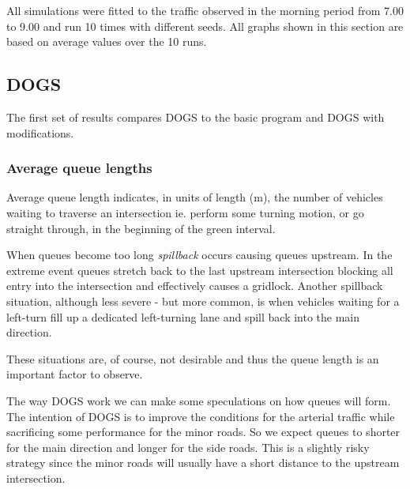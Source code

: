 All simulations were fitted to the traffic observed in the morning period from 7.00 to 9.00 and run 10 times with different seeds. All graphs shown in this section are based on average values over the 10 runs.

\subsection{DOGS}
The first set of results compares DOGS to the basic program and DOGS with modifications.

\subsubsection*{Average queue lengths}
Average queue length indicates, in units of length (m), the number of vehicles waiting to traverse an intersection ie. perform some turning motion, or go straight through, in the beginning of the green interval. 

When queues become too long \textit{spillback} occurs causing queues upstream. In the extreme event queues stretch back to the last upstream intersection blocking all entry into the intersection and effectively causes a gridlock.
Another spillback situation, although less severe - but more common, is when vehicles waiting for a left-turn fill up a dedicated left-turning lane and spill back into the main direction.

These situations are, of course, not desirable and thus the queue length is an important factor to observe.

The way DOGS work we can make some speculations on how queues will form. The intention of DOGS is to improve the conditions for the arterial traffic while sacrificing some performance for the minor roads. So we expect queues to shorter for the main direction and longer for the side roads. This is a slightly risky strategy since the minor roads will usually have a short distance to the upstream intersection.

